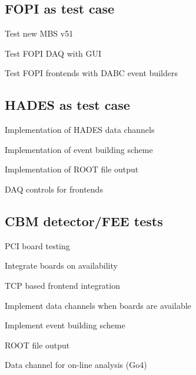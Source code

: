 \subsection{FOPI as test case}

\begin{compactitem}[$\bullet$]
\item Test new MBS v51
\item Test FOPI DAQ with GUI
\item Test FOPI frontends with DABC event builders
\end{compactitem}

\subsection{HADES as test case}

\begin{compactitem}[$\bullet$]
\item Implementation of HADES data channels
\item Implementation of event building scheme
\item Implementation of ROOT file output
\item DAQ controls for frontends
\end{compactitem}

\subsection{CBM detector/FEE tests}

\begin{compactitem}[$\bullet$]
\item PCI board testing
\begin{compactitem}[$\circ$]
\item Integrate boards on availability
\end{compactitem}
\item TCP based frontend integration
\begin{compactitem}[$\circ$]
\item Implement data channels when boards are available
\item Implement event building scheme
\item ROOT file output
\end{compactitem}
\item Data channel for on-line analysis (Go4)
\end{compactitem}

